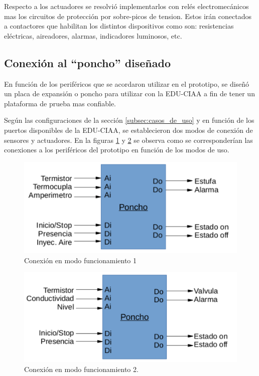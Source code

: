 Respecto a los actuadores se resolvió implementarlos con relés electromecánicos mas los circuitos de protección por sobre-picos de tension. Estos irán conectados a contactores que habilitan los distintos dispositivos como son: resistencias eléctricas, aireadores, alarmas, indicadores luminosos, etc.

\subsection{ Conexión al \enquote{poncho} diseñado }

En función de los periféricos que se acordaron utilizar en el prototipo, se diseñó un placa de expansión o poncho para utilizar con la EDU-CIAA a fin de tener un plataforma de prueba mas confiable. 

Según las configuraciones de la sección \ref{subsec:casos_de_uso} y en función de los puertos disponibles de la EDU-CIAA, se establecieron dos modos de conexión de sensores y actuadores. En la figuras \ref{fig:conectPerifericos1} y \ref{fig:conectPerifericos2} se observa como se corresponderían las conexiones a los periféricos del prototipo en función de los modos de uso. 

\begin{figure}[h!]
	\centering
	\includegraphics[width=.7\textwidth]{Figures/Cap_3/conexion_modo_1}
	\caption{Conexión en modo funcionamiento 1}
	\label{fig:conectPerifericos1}
\end{figure}

\begin{figure}[h!]
	\centering
	\includegraphics[width=.78\textwidth]{Figures/Cap_3/conexion_modo_2}
	\caption{Conexión en modo funcionamiento 2.}
	\label{fig:conectPerifericos2}
\end{figure}

